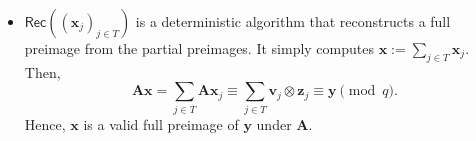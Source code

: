 \begin{itemize}
\begin{itemize}
        \item Define the Gaussian covariance parameter
        $
            \boldsymbol{\Sigma}_j
            :=
            \sigma^2
            (\mathbf{U}_j^{\top}\mathbf{U}_j)^{-1}.
        $

        \item Using the trapdoor $\mathsf{td}_{\mathbf{C}_j}$ of
        $\mathbf{C}_j$, sample
        $
            \mathbf{d}_j
            \gets
            \mathsf{SamplePre}
            (\mathbf{C}_j,\mathbf{T}_{\mathbf{C}_j},
            \mathbf{z}_j,\sqrt{\boldsymbol{\Sigma}_j}),
        $
        so that
        $
            \mathbf{C}_j\mathbf{d}_j
            \equiv
            \mathbf{z}_j
            \pmod q.
        $
        \item Finally, output
        $
            \mathbf{x}_j
            :=
            \mathbf{U}_j\mathbf{d}_j
            \in \mathbb{Z}^{2mk}.
        $
        By construction,
        \[
            \mathbf{A}\mathbf{x}_j
            =
            \mathbf{A}\mathbf{U}_j\mathbf{d}_j
            \equiv
            (\mathbf{v}_j\otimes \mathbf{C}_j)\mathbf{d}_j
            \equiv
            \mathbf{v}_j\otimes \mathbf{z}_j
            \pmod q.
        \]
    \end{itemize}

    \item $\mathsf{Rec}((\mathbf{x}_j)_{j\in T})$ is a deterministic algorithm
    that reconstructs a full preimage from the partial preimages. It simply
    computes
    $
        \mathbf{x}
        :=
        \sum_{j\in T}\mathbf{x}_j.
    $
    Then,
    \[
        \mathbf{A}\mathbf{x}
        =
        \sum_{j\in T}\mathbf{A}\mathbf{x}_j
        \equiv
        \sum_{j\in T}\mathbf{v}_j\otimes \mathbf{z}_j
        \equiv
        \mathbf{y}
        \pmod q.
    \]
    Hence, $\mathbf{x}$ is a valid full preimage of $\mathbf{y}$ under
    $\mathbf{A}$.
\end{itemize}